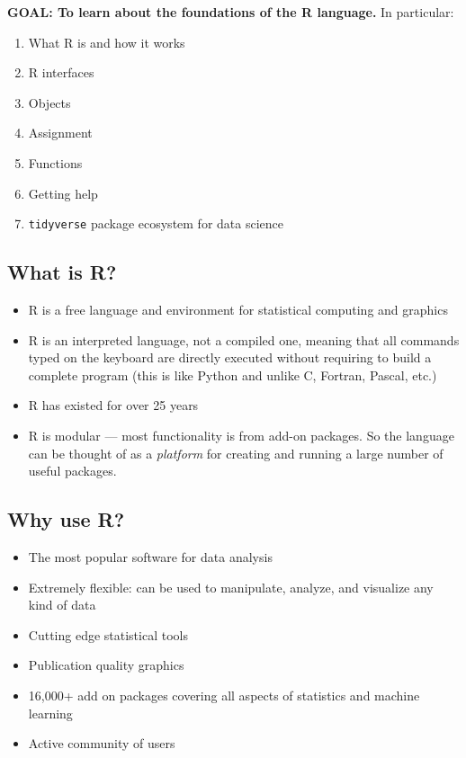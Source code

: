 \documentclass[
]{book}
\providecommand{\tightlist}{%
  \setlength{\itemsep}{0pt}\setlength{\parskip}{0pt}}
\begin{document}
\textbf{GOAL: To learn about the foundations of the R language.} In particular:

\begin{enumerate}
\def\labelenumi{\arabic{enumi}.}
\tightlist
\item
  What R is and how it works
\item
  R interfaces
\item
  Objects
\item
  Assignment
\item
  Functions
\item
  Getting help
\item
  \texttt{tidyverse} package ecosystem for data science
\end{enumerate}

\hypertarget{what-is-r}{%
\subsection{What is R?}\label{what-is-r}}

\begin{itemize}
\tightlist
\item
  R is a free language and environment for statistical computing and graphics
\item
  R is an interpreted language, not a compiled one, meaning that all commands typed on the keyboard are directly executed without requiring to build a complete program (this is like Python and unlike C, Fortran, Pascal, etc.)
\item
  R has existed for over 25 years
\item
  R is modular --- most functionality is from add-on packages. So the language can be thought of as a \emph{platform} for creating and running a large number of useful packages.
\end{itemize}

\hypertarget{why-use-r}{%
\subsection{Why use R?}\label{why-use-r}}

\begin{itemize}
\tightlist
\item
  The most popular software for data analysis
\item
  Extremely flexible: can be used to manipulate, analyze, and visualize any kind of data
\item
  Cutting edge statistical tools
\item
  Publication quality graphics
\item
  16,000+ add on packages covering all aspects of statistics and machine learning
\item
  Active community of users
\end{itemize}
\end{document}
